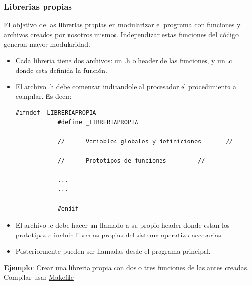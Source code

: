 \documentclass[10.5pt,scale=1.0,t,aspectratio=169,hyperref={pdfpagelabels=false}]{beamer}
\begin{document}
\begin{frame}[fragile]
	\frametitle{Librerias propias}
	El objetivo de las librerias propias en modularizar el programa con funciones y archivos creados por nosotros mismos. Independizar estas funciones del código generan mayor modularidad.
	{\footnotesize
	\begin{itemize}
		\item Cada libreria tiene dos archivos: un .h o header de las funciones, y un .c donde esta definida la función. 
		\item El archivo .h debe comenzar indicandole al procesador el procedimiento a compilar. Es decir:
		\begin{lstlisting}[style=CStyle]
			#ifndef _LIBRERIAPROPIA
			#define _LIBRERIAPROPIA
			
			// ---- Variables globales y definiciones ------//
			
			// ---- Prototipos de funciones --------//
			
			...
			...
			
			#endif
		\end{lstlisting}
		\item El archivo .c debe hacer un llamado a su propio header donde estan los prototipos e incluir librerias propias del sistema operativo necesarias. 
		\item Posteriormente pueden ser llamadas desde el programa principal.
	\end{itemize}
	}
	\textbf{Ejemplo}: Crear una libreria propia con dos o tres funciones de las antes creadas. Compilar usar \href{https://www.cs.colby.edu/maxwell/courses/tutorials/maketutor/}{Makefile}
\end{frame}
\end{document}
